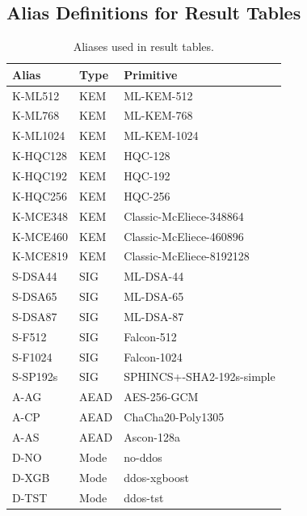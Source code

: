 \subsection{Alias Definitions for Result Tables}
\begin{table}[t]
\centering
\caption{Aliases used in result tables.}
\footnotesize
\setlength{\tabcolsep}{2.5pt}
\begin{tabular}{@{}lll@{}}\toprule
Alias & Type & Primitive \\ \midrule
K-ML512 & KEM & ML-KEM-512 \\
K-ML768 & KEM & ML-KEM-768 \\
K-ML1024 & KEM & ML-KEM-1024 \\
K-HQC128 & KEM & HQC-128 \\
K-HQC192 & KEM & HQC-192 \\
K-HQC256 & KEM & HQC-256 \\
K-MCE348 & KEM & Classic-McEliece-348864 \\
K-MCE460 & KEM & Classic-McEliece-460896 \\
K-MCE819 & KEM & Classic-McEliece-8192128 \\
S-DSA44 & SIG & ML-DSA-44 \\
S-DSA65 & SIG & ML-DSA-65 \\
S-DSA87 & SIG & ML-DSA-87 \\
S-F512 & SIG & Falcon-512 \\
S-F1024 & SIG & Falcon-1024 \\
S-SP192s & SIG & SPHINCS{+}-SHA2-192s-simple \\
A-AG & AEAD & AES-256-GCM \\
A-CP & AEAD & ChaCha20-Poly1305 \\
A-AS & AEAD & Ascon-128a \\
D-NO & Mode & no-ddos \\
D-XGB & Mode & ddos-xgboost \\
D-TST & Mode & ddos-tst \\
\bottomrule\end{tabular}
\label{tab:res-alias-manual}
\end{table}

